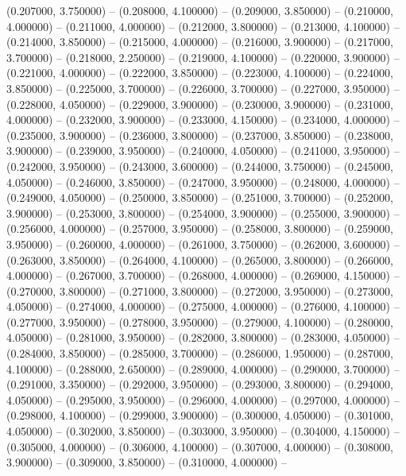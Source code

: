 (0.207000, 3.750000) -- 
(0.208000, 4.100000) -- 
(0.209000, 3.850000) -- 
(0.210000, 4.000000) -- 
(0.211000, 4.000000) -- 
(0.212000, 3.800000) -- 
(0.213000, 4.100000) -- 
(0.214000, 3.850000) -- 
(0.215000, 4.000000) -- 
(0.216000, 3.900000) -- 
(0.217000, 3.700000) -- 
(0.218000, 2.250000) -- 
(0.219000, 4.100000) -- 
(0.220000, 3.900000) -- 
(0.221000, 4.000000) -- 
(0.222000, 3.850000) -- 
(0.223000, 4.100000) -- 
(0.224000, 3.850000) -- 
(0.225000, 3.700000) -- 
(0.226000, 3.700000) -- 
(0.227000, 3.950000) -- 
(0.228000, 4.050000) -- 
(0.229000, 3.900000) -- 
(0.230000, 3.900000) -- 
(0.231000, 4.000000) -- 
(0.232000, 3.900000) -- 
(0.233000, 4.150000) -- 
(0.234000, 4.000000) -- 
(0.235000, 3.900000) -- 
(0.236000, 3.800000) -- 
(0.237000, 3.850000) -- 
(0.238000, 3.900000) -- 
(0.239000, 3.950000) -- 
(0.240000, 4.050000) -- 
(0.241000, 3.950000) -- 
(0.242000, 3.950000) -- 
(0.243000, 3.600000) -- 
(0.244000, 3.750000) -- 
(0.245000, 4.050000) -- 
(0.246000, 3.850000) -- 
(0.247000, 3.950000) -- 
(0.248000, 4.000000) -- 
(0.249000, 4.050000) -- 
(0.250000, 3.850000) -- 
(0.251000, 3.700000) -- 
(0.252000, 3.900000) -- 
(0.253000, 3.800000) -- 
(0.254000, 3.900000) -- 
(0.255000, 3.900000) -- 
(0.256000, 4.000000) -- 
(0.257000, 3.950000) -- 
(0.258000, 3.800000) -- 
(0.259000, 3.950000) -- 
(0.260000, 4.000000) -- 
(0.261000, 3.750000) -- 
(0.262000, 3.600000) -- 
(0.263000, 3.850000) -- 
(0.264000, 4.100000) -- 
(0.265000, 3.800000) -- 
(0.266000, 4.000000) -- 
(0.267000, 3.700000) -- 
(0.268000, 4.000000) -- 
(0.269000, 4.150000) -- 
(0.270000, 3.800000) -- 
(0.271000, 3.800000) -- 
(0.272000, 3.950000) -- 
(0.273000, 4.050000) -- 
(0.274000, 4.000000) -- 
(0.275000, 4.000000) -- 
(0.276000, 4.100000) -- 
(0.277000, 3.950000) -- 
(0.278000, 3.950000) -- 
(0.279000, 4.100000) -- 
(0.280000, 4.050000) -- 
(0.281000, 3.950000) -- 
(0.282000, 3.800000) -- 
(0.283000, 4.050000) -- 
(0.284000, 3.850000) -- 
(0.285000, 3.700000) -- 
(0.286000, 1.950000) -- 
(0.287000, 4.100000) -- 
(0.288000, 2.650000) -- 
(0.289000, 4.000000) -- 
(0.290000, 3.700000) -- 
(0.291000, 3.350000) -- 
(0.292000, 3.950000) -- 
(0.293000, 3.800000) -- 
(0.294000, 4.050000) -- 
(0.295000, 3.950000) -- 
(0.296000, 4.000000) -- 
(0.297000, 4.000000) -- 
(0.298000, 4.100000) -- 
(0.299000, 3.900000) -- 
(0.300000, 4.050000) -- 
(0.301000, 4.050000) -- 
(0.302000, 3.850000) -- 
(0.303000, 3.950000) -- 
(0.304000, 4.150000) -- 
(0.305000, 4.000000) -- 
(0.306000, 4.100000) -- 
(0.307000, 4.000000) -- 
(0.308000, 3.900000) -- 
(0.309000, 3.850000) -- 
(0.310000, 4.000000) -- 
